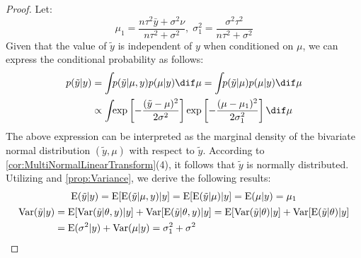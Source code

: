 \begin{proof}
	Let:
	\begin{equation*}
		\mu_1=\frac{n\tau^2\bar{y}+\sigma^2\nu}{n\tau^2+\sigma^2},\;\sigma^2_1=\frac{\sigma^2\tau^2}{n\tau^2+\sigma^2}
	\end{equation*}
	Given that the value of $\tilde{y}$ is independent of $y$ when conditioned on $\mu$, we can express the conditional probability as follows:
	\begin{align*}
		p(\tilde{y}|y)
		&=\int_{}p(\tilde{y}|\mu,y)p(\mu|y)\dif\mu=\int_{}p(\tilde{y}|\mu)p(\mu|y)\dif\mu \\
		&\propto\int_{}\exp\left[-\frac{(\tilde{y}-\mu)^2}{2\sigma^2}\right]\exp\left[-\frac{(\mu-\mu_1)^2}{2\sigma_1^2}\right]\dif\mu	
	\end{align*}
	The above expression can be interpreted as the marginal density of the bivariate normal distribution $(\tilde{y}, \mu)$ with respect to $\tilde{y}$. According to \cref{cor:MultiNormalLinearTransform}(4), it follows that $\tilde{y}$ is normally distributed. Utilizing  and \cref{prop:Variance}, we derive the following results:
	\begin{gather*}
		\operatorname{E}(\tilde{y}|y)=\operatorname{E}[\operatorname{E}(\tilde{y}|\mu,y)|y]=\operatorname{E}[\operatorname{E}(\tilde{y}|\mu)|y]=\operatorname{E}(\mu|y)=\mu_1 \\
		\begin{aligned}
			\operatorname{Var}(\tilde{y}|y)&=\operatorname{E}[\operatorname{Var}(\tilde{y}|\theta,y)|y]+\operatorname{Var}[\operatorname{E}(\tilde{y}|\theta,y)|y]=\operatorname{E}[\operatorname{Var}(\tilde{y}|\theta)|y]+\operatorname{Var}[\operatorname{E}(\tilde{y}|\theta)|y] \\
			&=\operatorname{E}(\sigma^2|y)+\operatorname{Var}(\mu|y)=\sigma_1^2+\sigma^2
		\end{aligned}\qedhere
	\end{gather*}
\end{proof}
